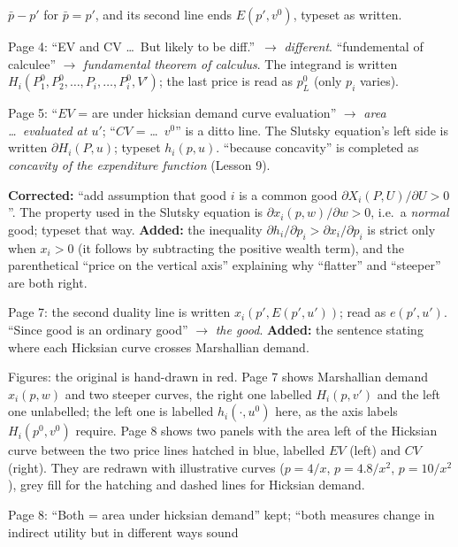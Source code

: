 \documentclass[11pt]{article}
\begin{document}
\begin{transcriptnotes}
        $\bar p-p'$ for $\bar p=p'$, and its second line ends $E(p',v^0)$, typeset
        as written.
  \item Page 4: ``EV and CV \dots\ But likely to be diff.''\ $\to$ \emph{different}.
        ``fundemental of calculee'' $\to$ \emph{fundamental theorem of calculus}.
        The integrand is written $H_i(P_1^0,P_2^0,\dots,P_i,\dots,P_i^0,V')$; the
        last price is read as $p_L^0$ (only $p_i$ varies).
  \item Page 5: ``$EV$ = are under hicksian demand curve evaluation'' $\to$
        \emph{area \dots\ evaluated at $u'$}; ``$CV$ = \dots\ $v^0$'' is a ditto
        line. The Slutsky equation's left side is written $\partial H_i(P,u)$;
        typeset $h_i(p,u)$. ``because concavity'' is completed as \emph{concavity
        of the expenditure function} (Lesson 9).
  \item \textbf{Corrected:} ``add assumption that good $i$ is a common good
        $\partial X_i(P,U)/\partial U>0$''. The property used in the Slutsky
        equation is $\partial x_i(p,w)/\partial w>0$, i.e.\ a \emph{normal} good;
        typeset that way. \textbf{Added:} the inequality
        $\partial h_i/\partial p_i>\partial x_i/\partial p_i$ is strict only when
        $x_i>0$ (it follows by subtracting the positive wealth term), and the
        parenthetical ``price on the vertical axis'' explaining why ``flatter''
        and ``steeper'' are both right.
  \item Page 7: the second duality line is written $x_i(p',E(p',u'))$; read as
        $e(p',u')$. ``Since good is an ordinary good'' $\to$ \emph{the good}.
        \textbf{Added:} the sentence stating where each Hicksian curve crosses
        Marshallian demand.
  \item Figures: the original is hand-drawn in red. Page 7 shows Marshallian
        demand $x_i(p,w)$ and two steeper curves, the right one labelled
        $H_i(p,v')$ and the left one unlabelled; the left one is labelled
        $h_i(\cdot,u^0)$ here, as the axis labels $H_i(p^0,v^0)$ require. Page 8 shows
        two panels with the area left of the Hicksian curve between the two price
        lines hatched in blue, labelled $EV$ (left) and $CV$ (right). They are
        redrawn with illustrative curves ($p=4/x$, $p=4.8/x^2$, $p=10/x^2$), grey
        fill for the hatching and dashed lines for Hicksian demand.
  \item Page 8: ``Both = area under hicksian demand'' kept;
        ``both measures change in indirect utility but in different ways sound

\end{transcriptnotes}
\end{document}
